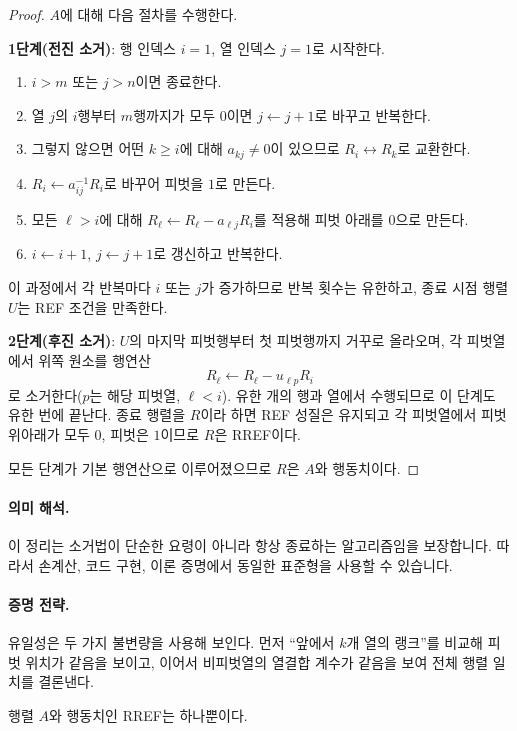 \begin{proof}
$A$에 대해 다음 절차를 수행한다.

\textbf{1단계(전진 소거)}:
행 인덱스 $i=1$, 열 인덱스 $j=1$로 시작한다.
\begin{enumerate}[label=(\alph*)]
\item $i>m$ 또는 $j>n$이면 종료한다.
\item 열 $j$의 $i$행부터 $m$행까지가 모두 $0$이면 $j\leftarrow j+1$로 바꾸고 반복한다.
\item 그렇지 않으면 어떤 $k\ge i$에 대해 $a_{kj}\neq 0$이 있으므로 $R_i\leftrightarrow R_k$로 교환한다.
\item $R_i\leftarrow a_{ij}^{-1}R_i$로 바꾸어 피벗을 $1$로 만든다.
\item 모든 $\ell>i$에 대해 $R_\ell\leftarrow R_\ell-a_{\ell j}R_i$를 적용해 피벗 아래를 $0$으로 만든다.
\item $i\leftarrow i+1$, $j\leftarrow j+1$로 갱신하고 반복한다.
\end{enumerate}

이 과정에서 각 반복마다 $i$ 또는 $j$가 증가하므로 반복 횟수는 유한하고, 종료 시점 행렬 $U$는 REF 조건을 만족한다.

\textbf{2단계(후진 소거)}:
$U$의 마지막 피벗행부터 첫 피벗행까지 거꾸로 올라오며, 각 피벗열에서 위쪽 원소를 행연산
\[
R_\ell\leftarrow R_\ell-u_{\ell p}R_{i}
\]
로 소거한다($p$는 해당 피벗열, $\ell<i$). 유한 개의 행과 열에서 수행되므로 이 단계도 유한 번에 끝난다. 종료 행렬을 $R$이라 하면 REF 성질은 유지되고 각 피벗열에서 피벗 위아래가 모두 $0$, 피벗은 $1$이므로 $R$은 RREF이다.

모든 단계가 기본 행연산으로 이루어졌으므로 $R$은 $A$와 행동치이다.
\end{proof}

\paragraph{의미 해석.}
이 정리는 소거법이 단순한 요령이 아니라 항상 종료하는 알고리즘임을 보장합니다. 따라서 손계산, 코드 구현, 이론 증명에서 동일한 표준형을 사용할 수 있습니다.

\paragraph{증명 전략.}
유일성은 두 가지 불변량을 사용해 보인다. 먼저 ``앞에서 $k$개 열의 랭크''를 비교해 피벗 위치가 같음을 보이고, 이어서 비피벗열의 열결합 계수가 같음을 보여 전체 행렬 일치를 결론낸다.

\begin{theorem}
행렬 $A$와 행동치인 RREF는 하나뿐이다.
\end{theorem}

